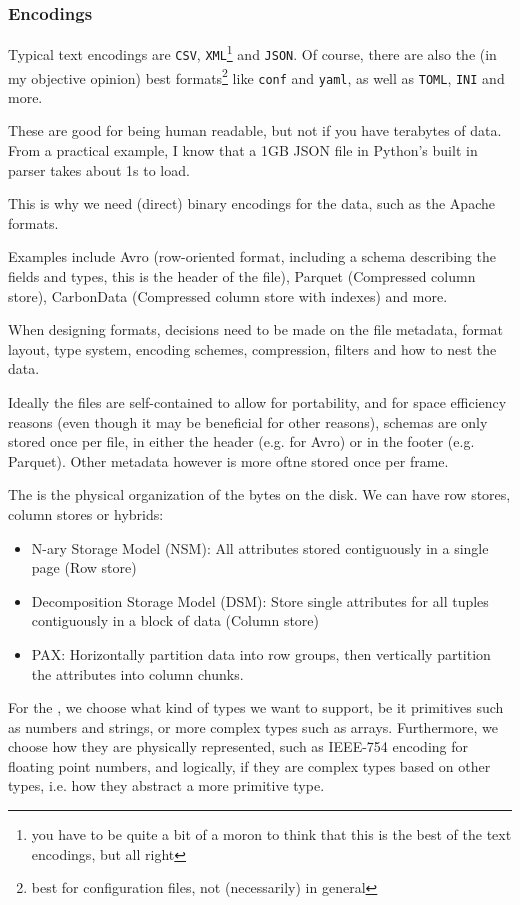 \subsubsection{Encodings}
Typical text encodings are \texttt{CSV}, \texttt{XML}\footnote{you have to be quite a bit of a moron to think that this is the best of the text encodings, but all right}
and \texttt{JSON}. Of course, there are also the (in my objective opinion) best formats\footnote{best for configuration files, not (necessarily) in general}
like \texttt{conf} and \texttt{yaml}, as well as \texttt{TOML}, \texttt{INI} and more.

These are good for being human readable, but not if you have terabytes of data.
From a practical example, I know that a 1GB JSON file in Python's built in parser takes about 1s to load.

This is why we need (direct) binary encodings for the data, such as the Apache formats.

Examples include Avro (row-oriented format, including a schema describing the fields and types, this is the header of the file), Parquet (Compressed column store),
CarbonData (Compressed column store with indexes) and more.

When designing formats, decisions need to be made on the file metadata, format layout, type system, encoding schemes, compression, filters and how to nest the data.

 Ideally the files are self-contained to allow for portability, and for space efficiency reasons (even though it may be beneficial for other reasons),
schemas are only stored once per file, in either the header (e.g. for Avro) or in the footer (e.g. Parquet). Other metadata however is more oftne stored once per frame.

The  is the physical organization of the bytes on the disk. We can have row stores, column stores or hybrids:
\begin{itemize}
    \item N-ary Storage Model (NSM): All attributes stored contiguously in a single page (Row store)
    \item Decomposition Storage Model (DSM): Store single attributes for all tuples contiguously in a block of data (Column store)
    \item PAX: Horizontally partition data into row groups, then vertically partition the attributes into column chunks.
\end{itemize}

For the , we choose what kind of types we want to support, be it primitives such as numbers and strings, or more complex types such as arrays.
Furthermore, we choose how they are physically represented, such as IEEE-754 encoding for floating point numbers, and logically, if they are complex types based on other types,
i.e. how they abstract a more primitive type.

